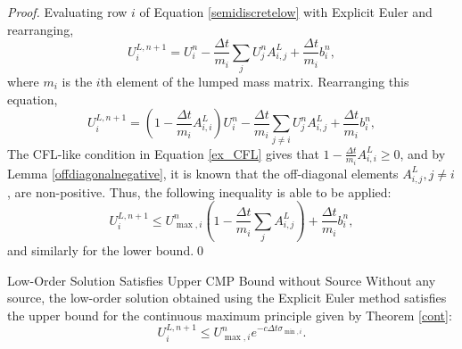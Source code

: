 \begin{proof}
Evaluating row $i$ of Equation \eqref{semidiscretelow} with Explicit Euler
and rearranging,
\[
   U_i^{L,n+1} = U_i^n - \frac{\Delta t}{m_i}\sum\limits_j U_j^n A^L_{i,j}
      + \frac{\Delta t}{m_i}b_i^n,
\]
where $m_i$ is the $i$th element of the lumped mass matrix.
Rearranging this equation,
\[
   U_i^{L,n+1} = \left(1-\frac{\Delta t}{m_i}A^L_{i,i}\right)U_i^n - \frac{\Delta t}{m_i}
      \sum\limits_{j\ne i} U_j^n A^L_{i,j} + \frac{\Delta t}{m_i}b_i^n,
\]
The CFL-like condition in Equation \eqref{ex_CFL} gives that $1-\frac{\Delta t}{m_i}A^L_{i,i} \ge 0$, and by
Lemma \ref{offdiagonalnegative}, it is known that the off-diagonal
elements $A^L_{i,j}, j\ne i$, are non-positive. Thus, the following inequality is
able to be applied:
\[
   U_i^{L,n+1} \le
   U_{\max,i}^n\left(1-\frac{\Delta t}{m_i}\sum\limits_j A^L_{i,j}\right)
      + \frac{\Delta t}{m_i}b_i^n,
\]
and similarly for the lower bound.\qed
\end{proof}
\begin{corollary}{Low-Order Solution Satisfies Upper CMP Bound without Source}
  \label{withoutsource}
   Without any source, the low-order solution obtained using the Explicit Euler
   method satisfies the upper bound
   for the continuous maximum principle given by Theorem \ref{cont}:
   \begin{equation}\label{loworderDMP}
      U_i^{L,n+1} \le
      U_{\max,i}^n e^{-c\Delta t\sigma_{\min,i}}.
   \end{equation}
\end{corollary}

